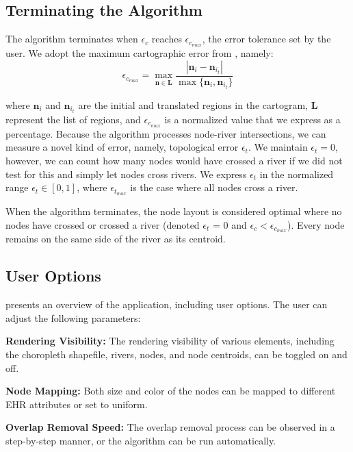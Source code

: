\documentclass[Afour,sagev,times]{sagej}
\newcommand{\bobgraph}[1]{\noindent\textbf{#1}}
\newcommand{\nodeList}{\bm{L}}
\newcommand{\nodeError}{\epsilon}
\newcommand{\nodeCartographicError}{\nodeError_{c}}
\newcommand{\nodeCartographicErrorMax}{\nodeError_{c_{max}}}
\newcommand{\nodeTopologicalError}{\nodeError_{t}}
\newcommand{\nodeTopologicalErrorMax}{\nodeError_{t_{max}}}
\newcommand{\node}{\bm{n}}
\begin{document}
\subsection{Terminating the Algorithm}
\label{subsec:{Terminating the Algorithm}}

The algorithm terminates when $ \nodeCartographicError $ reaches $ \nodeCartographicErrorMax $, the error tolerance set by the user. We adopt the maximum cartographic error from \citet{alam2015Quantitative}, namely: $$ \nodeCartographicErrorMax = \max _{\node \in \nodeList} \frac{|\node_i-\node_{i_t}|}{\max \{\node_i, \node_{i_t}\}}
$$

where $ \node_i $ and $ \node_{i_t} $ are the initial and translated regions in the cartogram, $ \nodeList $ represent the list of regions, and $ \nodeCartographicErrorMax $ is a normalized value that we express as a percentage.
Because the algorithm processes node-river intersections, we can measure a novel kind of error, namely, topological error $ \nodeTopologicalError $. We maintain $ \nodeTopologicalError = 0 $, however, we can count how many nodes would have crossed a river if we did not test for this and simply let nodes cross rivers. We express $ \nodeTopologicalError $ in the normalized range $ \nodeTopologicalError \in [0,1] $, where $ \nodeTopologicalErrorMax $ is the case where all nodes cross a river.

When the algorithm terminates, the node layout is considered optimal where no nodes have crossed or crossed a river (denoted $ \nodeTopologicalError $ = 0 and $ \nodeCartographicError < \nodeCartographicErrorMax $). Every node remains on the same side of the river as its centroid.

\subsection{User Options}\label{subsec:{UserOptions}}

 presents an overview of the application, including user options. The user can adjust the following parameters:

\bobgraph{Rendering Visibility:} The rendering visibility of various elements, including the choropleth shapefile, rivers, nodes, and node centroids, can be toggled on and off.

\bobgraph{Node Mapping:} Both size and color of the nodes can be mapped to different EHR attributes or set to uniform.

\bobgraph{Overlap Removal Speed:} The overlap removal process can be observed in a step-by-step manner, or the algorithm can be run automatically.
\end{document}
